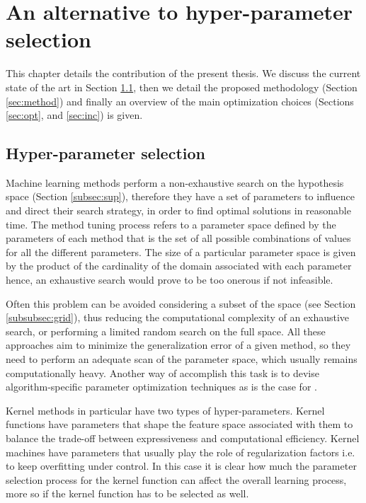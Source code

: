\chapter{An alternative to hyper-parameter selection}
\label{Chapter3}

This chapter details the contribution of the present thesis.
We discuss the current state of the art in Section \ref{sec:hyper}, then we detail
the proposed methodology (Section \ref{sec:method}) and finally an overview
of the main optimization choices (Sections \ref{sec:opt}, and \ref{sec:inc}) is
given.

\section{Hyper-parameter selection}
\label{sec:hyper}
Machine learning methods perform a non-exhaustive search on the hypothesis space
(Section \ref{subsec:sup}), therefore they have a set of parameters to influence
and direct their search strategy, in order to find optimal solutions in reasonable time.
The method tuning process refers to a parameter space defined by the parameters
of each method that is the set of all possible combinations of values for all the
different parameters.
The size of a particular parameter space is given by the product of the cardinality
of the domain associated with each parameter hence, an exhaustive search would
prove to be too onerous if not infeasible.


Often this problem can be avoided considering a subset of the space (see Section
\ref{subsubsec:grid}), thus reducing the computational complexity of an exhaustive
search, or performing a limited random search on the full space.
All these approaches aim to minimize the generalization error of a given method,
so they need to perform an adequate scan of the parameter space, which usually
remains computationally heavy.
Another way of accomplish this task is to devise algorithm-specific parameter
optimization techniques as is the case for \cite{chappelle}.

Kernel methods in particular have two types of hyper-parameters.
Kernel functions have parameters that shape the feature space associated with them
to balance the trade-off between expressiveness and computational efficiency.
Kernel machines have parameters that usually play the role of regularization
factors i.e. to keep overfitting under control.
In this case it is clear how much the parameter selection process for the kernel function
can affect the overall learning process, more so if the kernel function has to be
selected as well.

